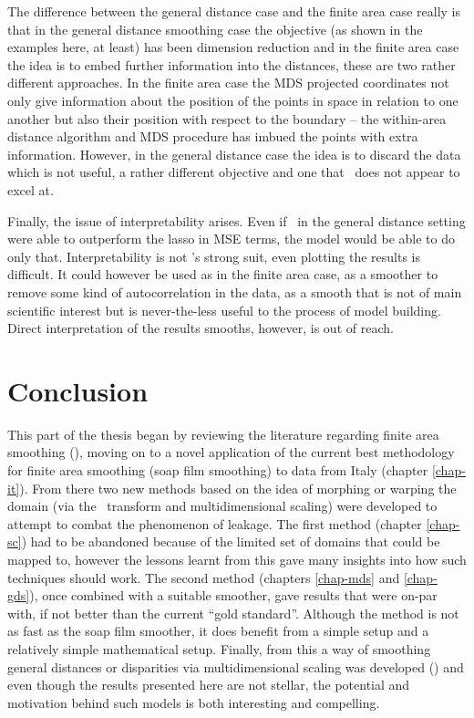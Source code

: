 The difference between the general distance case and the finite area case really is that in the general distance smoothing case the objective (as shown in the examples here, at least) has been dimension reduction and in the finite area case the idea is to embed further information into the distances, these are two rather different approaches. In the finite area case the MDS projected coordinates not only give information about the position of the points in space in relation to one another but also their position with respect to the boundary -- the within-area distance algorithm and MDS procedure has imbued the points with extra information. However, in the general distance case the idea is to discard the data which is not useful, a rather different objective and one that \mdsds\ does not appear to excel at.

Finally, the issue of interpretability arises. Even if \mdsds\ in the general distance setting were able to outperform the lasso in MSE terms, the model would be able to do only that. Interpretability is not \mdsds's strong suit, even plotting the results is difficult. It could however be used as in the finite area case, as a smoother to remove some kind of autocorrelation in the data, as a smooth that is not of main scientific interest but is never-the-less useful to the process of model building. Direct interpretation of the results smooths, however, is out of reach.

\section{Conclusion}

This part of the thesis began by reviewing the literature regarding finite area smoothing (), moving on to a novel application of the current best methodology for finite area smoothing (soap film smoothing) to data from Italy (chapter \ref{chap-it}). From there two new methods based on the idea of morphing or warping the domain (via the \sch\ transform and multidimensional scaling) were developed to attempt to combat the phenomenon of leakage. The first method (chapter \ref{chap-sc}) had to be abandoned because of the limited set of domains that could be mapped to, however the lessons learnt from this gave many insights into how such techniques should work. The second method (chapters \ref{chap-mds} and \ref{chap-gds}), once combined with a suitable smoother, gave results that were on-par with, if not better than the current ``gold standard''. Although the method is not as fast as the soap film smoother, it does benefit from a simple setup and a relatively simple mathematical setup. Finally, from this a way of smoothing general distances or disparities via multidimensional scaling was developed () and even though the results presented here are not stellar, the potential and motivation behind such models is both interesting and compelling.

